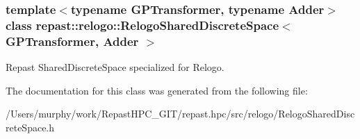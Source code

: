 \subsubsection*{template$<$typename G\-P\-Transformer, typename Adder$>$class repast\-::relogo\-::\-Relogo\-Shared\-Discrete\-Space$<$ G\-P\-Transformer, Adder $>$}

Repast Shared\-Discrete\-Space specialized for Relogo. 

The documentation for this class was generated from the following file\-:\begin{DoxyCompactItemize}
\item 
/\-Users/murphy/work/\-Repast\-H\-P\-C\-\_\-\-G\-I\-T/repast.\-hpc/src/relogo/Relogo\-Shared\-Discrete\-Space.\-h\end{DoxyCompactItemize}
